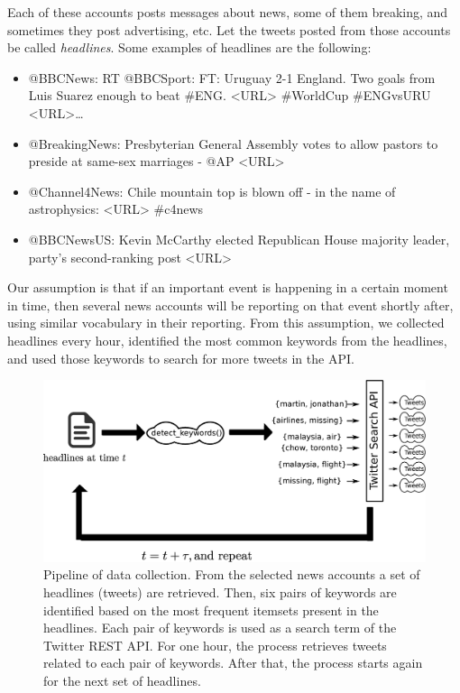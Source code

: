 Each of these accounts posts messages about news, some of them breaking, and
sometimes they post advertising, etc. 
%
Let the tweets posted from those accounts be called \emph{headlines}. Some
examples of headlines are the following: 

{\it 
\begin{itemize}
\item @BBCNews: RT @BBCSport: FT: Uruguay 2-1 England. Two goals from
  Luis Suarez enough to beat \#ENG. <URL> \#WorldCup
  \#ENGvsURU <URL>…
\item @BreakingNews: Presbyterian General Assembly votes to allow
  pastors to preside at same-sex marriages - @AP
  <URL>
\item @Channel4News: Chile mountain top is blown off - in the name of
  astrophysics: <URL> \#c4news
\item @BBCNewsUS: Kevin McCarthy elected Republican House majority
  leader, party's second-ranking post <URL>
\end{itemize}
}

Our assumption is that if an important event is happening in a certain moment in
time, then several news accounts will be reporting on that event shortly after,
using similar vocabulary in their reporting.
%
From this assumption, we collected headlines every hour, identified the most
common keywords from the headlines, and used those keywords to search for more
tweets in the API.

\begin{figure}
\begin{center}
\includegraphics[width=\textwidth]{figures/data/data_collection_1}
\caption[Pipeline of data collection]{Pipeline of data collection. From the
  selected news accounts a set of headlines (tweets) are retrieved. Then, six
  pairs of keywords are identified based on the most frequent itemsets present
  in the headlines. Each pair of keywords is used as a search term of the
  Twitter REST API. For one hour, the process retrieves tweets related to each
  pair of keywords. After that, the process starts again for the next set of
  headlines.}
\label{fig:pipeline}
\end{center}
\end{figure}



